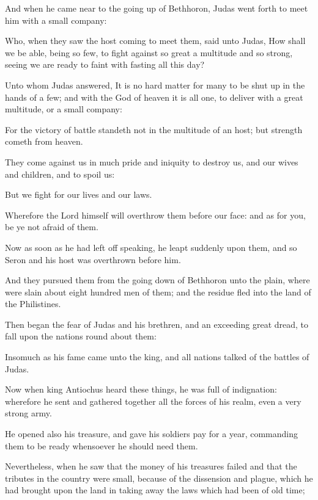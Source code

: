 {\par }{\PP {}And when he came near to the going up of Bethhoron, Judas went forth to meet him with a small company:
\par }{\PP {}Who, when they saw the host coming to meet them, said unto Judas, How shall we be able, being so few, to fight against so great a multitude and so strong, seeing we are ready to faint with fasting all this day?
\par }{\PP {}Unto whom Judas answered, It is no hard matter for many to be shut up in the hands of a few; and with the God of heaven it is all one, to deliver with a great multitude, or a small company:
\par }{\PP {}For the victory of battle standeth not in the multitude of an host; but strength cometh from heaven.
\par }{\PP {}They come against us in much pride and iniquity to destroy us, and our wives and children, and to spoil us:
\par }{\PP {}But we fight for our lives and our laws.
\par }{\PP {}Wherefore the Lord himself will overthrow them before our face: and as for you, be ye not afraid of them.
\par }{\PP {}Now as soon as he had left off speaking, he leapt suddenly upon them, and so Seron and his host was overthrown before him.
\par }{\PP {}And they pursued them from the going down of Bethhoron unto the plain, where were slain about eight hundred men of them; and the residue fled into the land of the Philistines.
\par }{\PP {}Then began the fear of Judas and his brethren, and an exceeding great dread, to fall upon the nations round about them:
\par }{\PP {}Insomuch as his fame came unto the king, and all nations talked of the battles of Judas.
\par }{\PP {}Now when king Antiochus heard these things, he was full of indignation: wherefore he sent and gathered together all the forces of his realm, even a very strong army.
\par }{\PP {}He opened also his treasure, and gave his soldiers pay for a year, commanding them to be ready whensoever he should need them.
\par }{\PP {}Nevertheless, when he saw that the money of his treasures failed and that the tributes in the country were small, because of the dissension and plague, which he had brought upon the land in taking away the laws which had been of old time;
}
